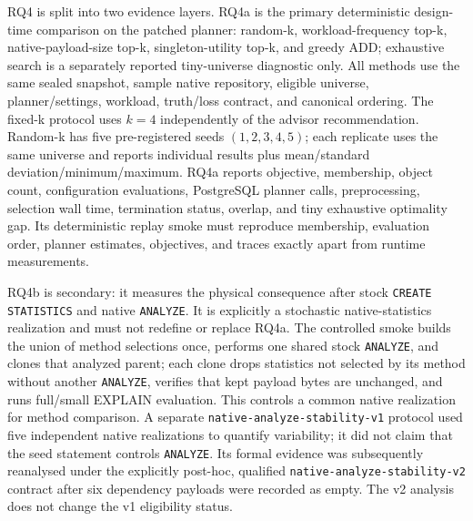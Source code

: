 RQ4 is split into two evidence layers. RQ4a is the primary deterministic
design-time comparison on the patched planner: random-k, workload-frequency
top-k, native-payload-size top-k, singleton-utility top-k, and greedy ADD;
exhaustive search is a separately reported tiny-universe diagnostic only. All
methods use the same sealed snapshot, sample native repository, eligible
universe, planner/settings, workload, truth/loss contract, and canonical
ordering. The fixed-k protocol uses $k=4$ independently of the advisor
recommendation. Random-k has five pre-registered seeds $(1,2,3,4,5)$; each
replicate uses the same universe and reports individual results plus
mean/standard deviation/minimum/maximum. RQ4a reports objective, membership,
object count, configuration evaluations, PostgreSQL planner calls,
preprocessing, selection wall time, termination status, overlap, and tiny
exhaustive optimality gap. Its deterministic replay smoke must reproduce
membership, evaluation order, planner estimates, objectives, and traces
exactly apart from runtime measurements.

RQ4b is secondary: it measures the physical consequence after stock
\texttt{CREATE STATISTICS} and native \texttt{ANALYZE}. It is explicitly a
stochastic native-statistics realization and must not redefine or replace
RQ4a. The controlled smoke builds the union of method selections once,
performs one shared stock \texttt{ANALYZE}, and clones that analyzed parent;
each clone drops statistics not selected by its method without another
\texttt{ANALYZE}, verifies that kept payload bytes are unchanged, and runs
full/small EXPLAIN evaluation. This controls a common native realization for
method comparison. A separate \texttt{native-analyze-stability-v1} protocol
used five independent native realizations to quantify variability; it did not
claim that the seed statement controls \texttt{ANALYZE}. Its formal evidence
was subsequently reanalysed under the explicitly post-hoc, qualified
\texttt{native-analyze-stability-v2} contract after six dependency payloads
were recorded as empty. The v2 analysis does not change the v1 eligibility
status.

